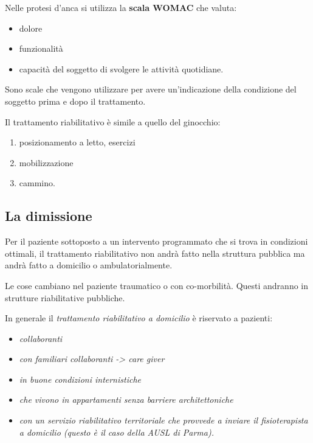 Nelle protesi d'anca si utilizza la \textbf{scala WOMAC} che valuta:

\begin{itemize}
\item
  dolore
\item
  funzionalità
\item
  capacità del soggetto di svolgere le attività quotidiane.
\end{itemize}

Sono scale che vengono utilizzare per avere un'indicazione della
condizione del soggetto prima e dopo il trattamento.

Il trattamento riabilitativo è simile a quello del ginocchio:

\begin{enumerate}
\def\labelenumi{\arabic{enumi})}
\item
  posizionamento a letto, esercizi
\item
  mobilizzazione
\item
  cammino.
\end{enumerate}

\subsection{La dimissione}


Per il paziente sottoposto a un intervento programmato che si trova in
condizioni ottimali, il trattamento riabilitativo non andrà fatto nella
struttura pubblica ma andrà fatto a domicilio o ambulatorialmente.

Le cose cambiano nel paziente traumatico o con co-morbilità. Questi
andranno in strutture riabilitative pubbliche.

In generale il \emph{trattamento riabilitativo a domicilio} è riservato
a pazienti:

\begin{itemize}
\item
  \emph{collaboranti}
\item
  \emph{con familiari collaboranti -> care giver}
\item
  \emph{in buone condizioni internistiche}
\item
  \emph{che vivono in appartamenti senza barriere architettoniche}
\item
  \emph{con un servizio riabilitativo territoriale che provvede a
  inviare il fisioterapista a domicilio (questo è il caso della AUSL di
  Parma).}
\end{itemize}

